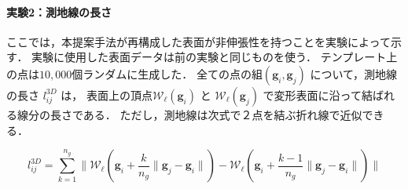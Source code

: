 \documentclass[10.5pt,twocolumn,a4j,fleqn]{ujarticle}
\begin{document}
\paragraph{実験2：測地線の長さ}
ここでは，本提案手法が再構成した表面が非伸張性を持つことを実験によって示す．
実験に使用した表面データは前の実験と同じものを使う．
テンプレート上の点は$10,000$個ランダムに生成した．
全ての点の組$(\bm{g}_i,\bm{g}_j)$ について，測地線の長さ $l_{ij}^{3D}$ は，
表面上の頂点$ \mathcal{W}_{\bm{\ell}}(\bm{g}_i)$ と $ \mathcal{W}_{\bm{\ell}}(\bm{g}_j)$
で変形表面に沿って結ばれる線分の長さである．
ただし，測地線は次式で２点を結ぶ折れ線で近似できる．

\begin{equation}
    l_{ij}^{3D} = \sum_{k=1}^{n_g} \| \mathcal{W}_{\bm{\ell}}(\bm{g}_i + \frac{k}{n_g}\|\bm{g}_j - \bm{g}_i\|) -  \mathcal{W}_{\bm{\ell}}(\bm{g}_i + \frac{k-1}{n_g}\|\bm{g}_j - \bm{g}_i\|)\|
\end{equation}
\end{document}

